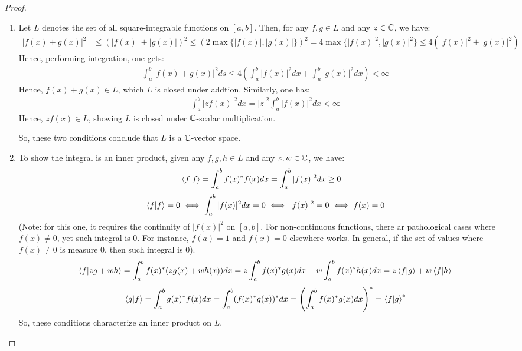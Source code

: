 \documentclass{article}
\begin{document}
\begin{proof}

    \hfil

    \begin{enumerate}
        \item Let $L$ denotes the set of all square-integrable functions on $[a,b]$. Then, for any $f,g \in L$ and any $z \in\mathbb{C}$, we have:
        \begin{align}
            |f(x)+g(x)|^2 &\leq (|f(x)|+|g(x)|)^2 \leq (2\max\{|f(x)|,|g(x)|\})^2 = 4\max\{|f(x)|^2,|g(x)|^2\} \leq 4(|f(x)|^2+|g(x)|^2)
        \end{align}
        Hence, performing integration, one gets:
        \begin{align}
            \int_{a}^{b}|f(x)+g(x)|^2ds \leq 4\left(\int_{a}^{b}|f(x)|^2dx+\int_{a}^{b}|g(x)|^2dx\right) < \infty
        \end{align}
        Hence, $f(x)+g(x)\in L$, which $L$ is closed under addtion. Similarly, one has:
        \begin{align}
            \int_{a}^{b}|z f(x)|^2 dx = |z|^2\int_{a}^{b}|f(x)|^2 dx < \infty
        \end{align}
        Hence, $z f(x)\in L$, showing $L$ is closed under $\mathbb{C}$-scalar multiplication.

        So, these two conditions conclude that $L$ is a $\mathbb{C}$-vector space.

        \hfil

        \item To show the integral is an inner product, given any $f,g,h\in L$ and any $z, w\in\mathbb{C}$, we have:
        \begin{align}
            \braket{f}{f}&=\int_{a}^{b}f(x)^*f(x)dx = \int_{a}^{b}|f(x)|^2dx \geq 0
        \end{align}
        \begin{align}
            \braket{f}{f}=0 \iff \int_{a}^{b}|f(x)|^2dx = 0\iff |f(x)|^2=0 \iff f(x)=0
        \end{align}
        (Note: for this one, it requires the continuity of $|f(x)|^2$ on $[a,b]$. For non-continuous functions, there ar pathological cases where $f(x)\neq 0$, yet such integral is $0$. For instance, $f(a)=1$ and $f(x)=0$ elsewhere works. In general, if the set of values where $f(x)\neq 0$ is measure $0$, then such integral is $0$).
        \begin{align}
            \braket{f}{z g+wh}=\int_{a}^{b}f(x)^*(zg(x)+w h(x))dx = z\int_{a}^{b}f(x)^*g(x)dx+w\int_{a}^{b}f(x)^*h(x)dx = z\braket{f}{g}+w\braket{f}{h}
        \end{align}
        \begin{align}
            \braket{g}{f}=\int_{a}^{b}g(x)^*f(x)dx = \int_{a}^{b}(f(x)^*g(x))^* dx = \left(\int_{a}^{b}f(x)^*g(x)dx\right)^* = \braket{f}{g}^*
        \end{align}
        So, these conditions characterize an inner product on $L$.
    \end{enumerate}
\end{proof}
\end{document}
